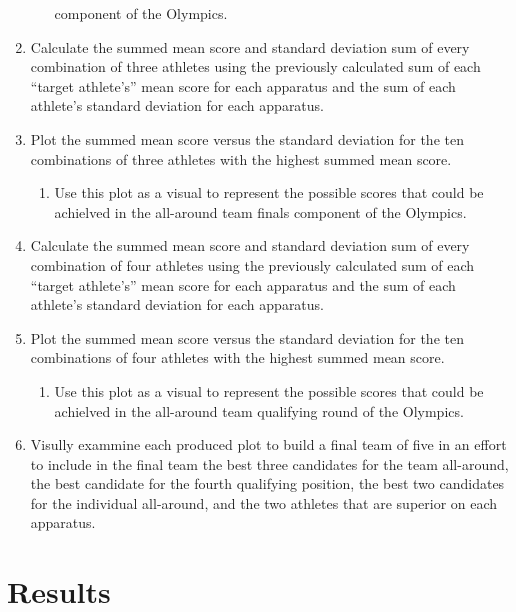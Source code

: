 \documentclass[12pt]{article}
\begin{document}
\begin{enumerate}
\begin{enumerate}
    component of the Olympics.
  \end{enumerate}
  \item Calculate the summed mean score and standard deviation sum of every combination of three athletes using the previously 
  calculated sum of each ``target athlete's'' mean score for each apparatus and the sum of each athlete's standard 
  deviation for each apparatus.
  \item Plot the summed mean score versus the standard deviation for the ten combinations of three athletes with the 
  highest summed mean score.
  \begin{enumerate}
    \item Use this plot as a visual to represent the possible scores that could be achielved in the all-around team finals 
   component of the Olympics.
  \end{enumerate}
  \item Calculate the summed mean score and standard deviation sum of every combination of four athletes using the previously 
  calculated sum of each ``target athlete's'' mean score for each apparatus and the sum of each athlete's standard 
  deviation for each apparatus.
  \item Plot the summed mean score versus the standard deviation for the ten combinations of four athletes with the 
  highest summed mean score.
  \begin{enumerate}
    \item Use this plot as a visual to represent the possible scores that could be achielved in the all-around team qualifying  
   round of the Olympics.
  \end{enumerate}
  \item Visully exammine each produced plot to build a final team of five in an effort to include in 
  the final team the best three candidates for the team all-around, the best candidate for the fourth qualifying position, 
  the best two candidates for the individual all-around, and the two athletes that are superior on each apparatus.

\end{enumerate}



\section{Results}
\label{sec:res}
\end{document}
